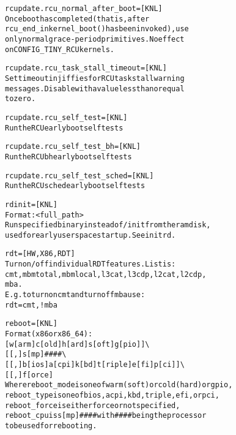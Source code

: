 \documentclass[a4paper,8pt,english]{sphinxmanual}
\begin{document}
\begin{alltt}
        rcupdate.rcu\_normal\_after\_boot= {[}KNL{]}
                        Once boot has completed (that is, after
                        rcu\_end\_inkernel\_boot() has been invoked), use
                        only normal grace-period primitives.  No effect
                        on CONFIG\_TINY\_RCU kernels.

        rcupdate.rcu\_task\_stall\_timeout= {[}KNL{]}
                        Set timeout in jiffies for RCU task stall warning
                        messages.  Disable with a value less than or equal
                        to zero.

        rcupdate.rcu\_self\_test= {[}KNL{]}
                        Run the RCU early boot self tests

        rcupdate.rcu\_self\_test\_bh= {[}KNL{]}
                        Run the RCU bh early boot self tests

        rcupdate.rcu\_self\_test\_sched= {[}KNL{]}
                        Run the RCU sched early boot self tests

        rdinit=         {[}KNL{]}
                        Format: \textless{}full\_path\textgreater{}
                        Run specified binary instead of /init from the ramdisk,
                        used for early userspace startup. See initrd.

        rdt=            {[}HW,X86,RDT{]}
                        Turn on/off individual RDT features. List is:
                        cmt, mbmtotal, mbmlocal, l3cat, l3cdp, l2cat, l2cdp,
                        mba.
                        E.g. to turn on cmt and turn off mba use:
                                rdt=cmt,!mba

        reboot=         {[}KNL{]}
                        Format (x86 or x86\_64):
                                {[}w{[}arm{]} \textbar{} c{[}old{]} \textbar{} h{[}ard{]} \textbar{} s{[}oft{]} \textbar{} g{[}pio{]}{]} \textbackslash{}
                                {[}{[},{]}s{[}mp{]}\#\#\#\# \textbackslash{}
                                {[}{[},{]}b{[}ios{]} \textbar{} a{[}cpi{]} \textbar{} k{[}bd{]} \textbar{} t{[}riple{]} \textbar{} e{[}fi{]} \textbar{} p{[}ci{]}{]} \textbackslash{}
                                {[}{[},{]}f{[}orce{]}
                        Where reboot\_mode is one of warm (soft) or cold (hard) or gpio,
                              reboot\_type is one of bios, acpi, kbd, triple, efi, or pci,
                              reboot\_force is either force or not specified,
                              reboot\_cpu is s{[}mp{]}\#\#\#\# with \#\#\#\# being the processor
                                        to be used for rebooting.


\end{alltt}
\end{document}
